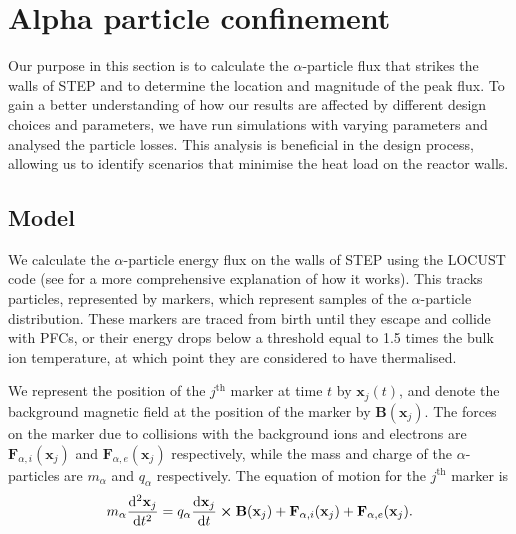 \documentclass[10pt, a4paper, twoside]{article}
\begin{document}
\section{Alpha particle confinement}
\label{sec:locust_work}

Our purpose in this section is to calculate the $\alpha$-particle flux that strikes the walls of STEP and to determine the location and magnitude of the peak flux. To gain a better understanding of how our results are affected by different design choices and parameters, we have run simulations with varying parameters and analysed the particle losses. This analysis is beneficial in the design process, allowing us to identify scenarios that minimise the heat load on the reactor walls.

\subsection{Model}

We calculate the $\alpha$-particle energy flux on the walls of STEP using the LOCUST code (see \cite{akers2018, ward2021} for a more comprehensive explanation of how it works). This tracks particles, represented by markers, which represent samples of the $\alpha$-particle distribution. These markers are traced from birth until they escape and collide with PFCs, or their energy drops below a threshold equal to 1.5 times the bulk ion temperature, at which point they are considered to have thermalised.

We represent the position of the $j^{\text{th}}$ marker at time $t$ by $\mathbf{x}_j(t)$, and denote
the background magnetic field at the position of the marker by $\textbf{B}(\mathbf{x}_j)$.
The forces on the marker due to collisions with the background ions and electrons are $\textbf{F}_{\alpha,i}(\mathbf{x}_j)$ and $\textbf{F}_{\alpha,e}(\mathbf{x}_j)$ respectively, while the mass and charge of the $\alpha$-particles are $m_\alpha$ and $q_\alpha$ respectively. The equation of motion for the $j^{\text{th}}$ marker is
\begin{equation}
m_\alpha\dv[2]{\mathbf{x}_j}{t} = q_\alpha\dv{\mathbf{x}_j}{t}\cross\textbf{B}(\mathbf{x}_j) + \textbf{F}_{\alpha,i}(\mathbf{x}_j) + \textbf{F}_{\alpha,e}(\mathbf{x}_j).
\end{equation}
\end{document}
